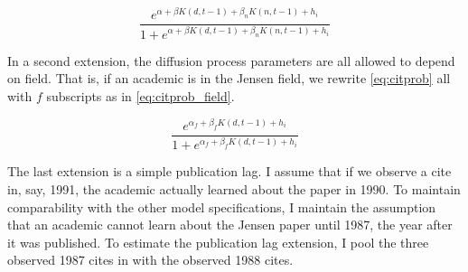 \documentclass[]{article}
\begin{document}
\begin{equation}
    \frac{e^{\alpha + \beta K(d,t-1) + \beta_n K(n,t-1) + h_i}}{1 + e^{\alpha + \beta K(d,t-1) + \beta_n K(n,t-1) + h_i}}
    \label{eq:citprob_reg}
\end{equation}

In a second extension, the diffusion process parameters are all allowed
to depend on field. That is, if an academic is in the Jensen field, we rewrite
\eqref{eq:citprob} all with $f$ subscripts as in \eqref{eq:citprob_field}.

\begin{equation}
    \frac{e^{\alpha_f + \beta_f K(d,t-1) + h_i}}{1 + e^{\alpha_f + \beta_f K(d,t-1) + h_i}}
    \label{eq:citprob_field}
\end{equation}

The last extension is a simple publication lag.  I assume that if we observe a cite in, say, 1991,
the academic actually learned about the paper in 1990.  To maintain comparability with the other model
specifications, I maintain the assumption that an academic cannot learn about the Jensen paper
until 1987, the year after it was published.  To estimate the publication lag extension,
I pool the three observed 1987 cites in with the observed 1988 cites.
\end{document}
